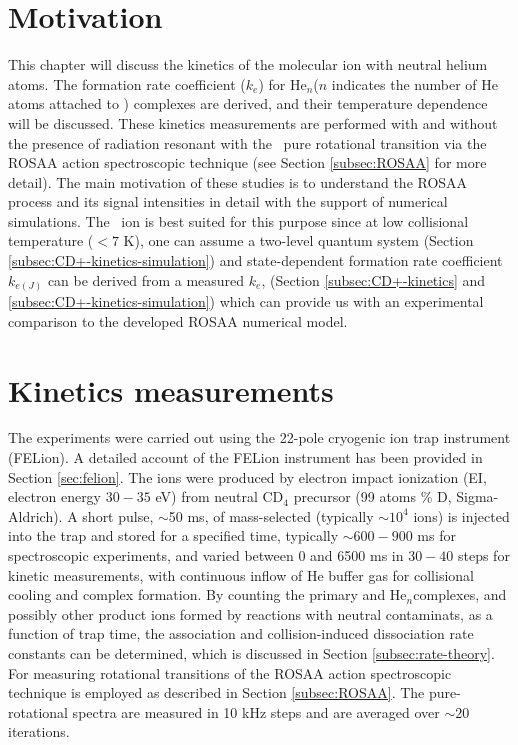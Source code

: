 \section{Motivation}
\label{sec:CD+-kinetics-motivation}

This chapter will discuss the kinetics of the \CD molecular ion with neutral
helium atoms. The formation rate coefficient ($k_e$) for He$_n$\CD ($n$
indicates the number of He atoms attached to \CD) complexes are derived,
and their temperature dependence will be discussed. These kinetics measurements
are performed with and without the presence of radiation resonant with the \CD\
\CDline pure rotational transition via the ROSAA action spectroscopic technique
(see Section \ref{subsec:ROSAA} for more detail). The main motivation of these
studies is to understand the ROSAA process and its signal intensities in detail
with the support of numerical simulations. The \CD\ ion is best suited
for this purpose since at low collisional temperature ($<7$ K), one can
assume a two-level quantum system (Section
\ref{subsec:CD+-kinetics-simulation}) and state-dependent formation rate
coefficient $k_{e(J)}$ can be derived from a measured $k_e$, (Section
\ref{subsec:CD+-kinetics} and \ref{subsec:CD+-kinetics-simulation}) which can
provide us with an experimental comparison to the developed ROSAA numerical
model.

\section{Kinetics measurements}
\label{sec:CD+-kinetics}
The experiments were carried out using the 22-pole cryogenic ion trap instrument (FELion). A detailed account of the FELion instrument has been provided in Section \ref{sec:felion}. The \CD ions were produced by electron impact ionization (EI, electron energy $30-35$ eV) from neutral CD$_4$ precursor (99 atoms \% D, Sigma-Aldrich). A short pulse, $\sim$50 ms, of mass-selected \CD (typically $\sim 10^4$ ions) is injected into the trap and stored for a specified time, typically $\sim 600-900$ ms for spectroscopic experiments, and varied between 0 and 6500 ms in $30-40$ steps for kinetic measurements, with continuous inflow of He buffer gas for collisional cooling and complex formation. By counting the primary \CD and He$_n$\CD complexes, and possibly other product ions formed by reactions with neutral contaminats, as a function of trap time, the association and collision-induced dissociation rate constants can be determined, which is discussed in Section \ref{subsec:rate-theory}. For measuring rotational transitions of \CD the ROSAA action spectroscopic technique is employed as described in Section \ref{subsec:ROSAA}. The pure-rotational spectra are measured in 10 kHz steps and are averaged over $\sim 20$ iterations.

